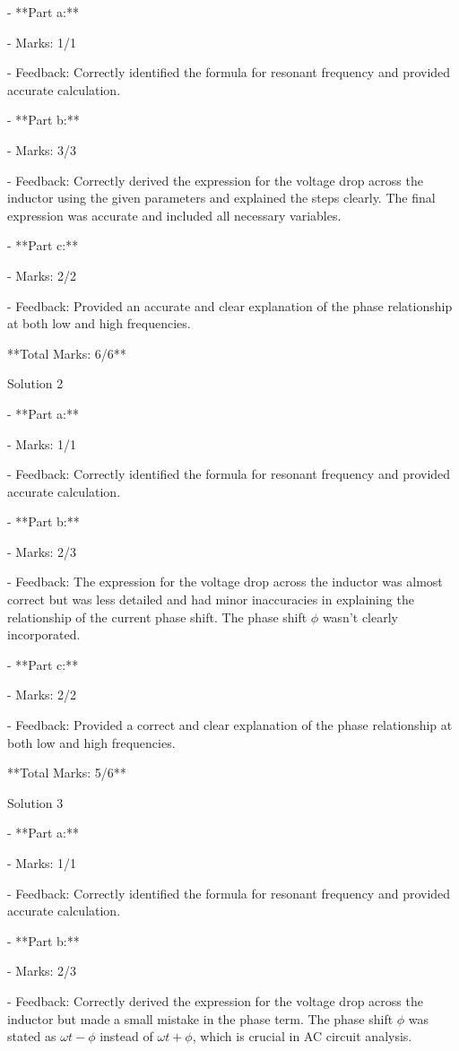 \documentclass[a4paper,11pt]{article}
\begin{document}
- **Part a:**

  - Marks: 1/1
  
  - Feedback: Correctly identified the formula for resonant frequency and provided accurate calculation.
  
- **Part b:**

  - Marks: 3/3
  
  - Feedback: Correctly derived the expression for the voltage drop across the inductor using the given parameters and explained the steps clearly. The final expression was accurate and included all necessary variables.
  
- **Part c:**

  - Marks: 2/2
  
  - Feedback: Provided an accurate and clear explanation of the phase relationship at both low and high frequencies.

**Total Marks: 6/6**

Solution 2

- **Part a:**

  - Marks: 1/1
  
  - Feedback: Correctly identified the formula for resonant frequency and provided accurate calculation.
  
- **Part b:**

  - Marks: 2/3
  
  - Feedback: The expression for the voltage drop across the inductor was almost correct but was less detailed and had minor inaccuracies in explaining the relationship of the current phase shift. The phase shift \(\phi\) wasn't clearly incorporated.
  
- **Part c:**

  - Marks: 2/2
  
  - Feedback: Provided a correct and clear explanation of the phase relationship at both low and high frequencies.

**Total Marks: 5/6**

Solution 3

- **Part a:**

  - Marks: 1/1
  
  - Feedback: Correctly identified the formula for resonant frequency and provided accurate calculation.
  
- **Part b:**

  - Marks: 2/3
  
  - Feedback: Correctly derived the expression for the voltage drop across the inductor but made a small mistake in the phase term. The phase shift \(\phi\) was stated as \(\omega t - \phi\) instead of \(\omega t + \phi\), which is crucial in AC circuit analysis.
  
\end{document}
